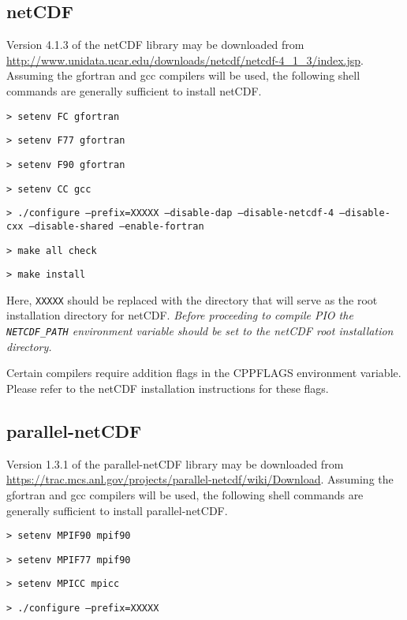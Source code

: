 \subsection{netCDF}
\label{serial_netcdf}

Version 4.1.3 of the netCDF library may be downloaded from
\url{http://www.unidata.ucar.edu/downloads/netcdf/netcdf-4\_1\_3/index.jsp}.
Assuming the gfortran and gcc compilers will be used, the following shell
commands are generally sufficient to install netCDF.

\vspace{12pt}
{\tt > setenv FC gfortran}

{\tt > setenv F77 gfortran} 

{\tt > setenv F90 gfortran}

{\tt > setenv CC gcc} 

{\tt > ./configure --prefix=XXXXX --disable-dap --disable-netcdf-4 --disable-cxx \hfill\break --disable-shared --enable-fortran} 

{\tt > make all check}

{\tt > make install}
\vspace{12pt}

Here, {\tt XXXXX} should be replaced with the directory that will serve as the
root installation directory for netCDF.  {\em Before proceeding to compile PIO
the {\tt NETCDF\_PATH} environment variable should be set to the netCDF root
installation directory.}

Certain compilers require addition flags in the CPPFLAGS environment variable.
Please refer to the netCDF installation instructions for these flags.

\subsection{parallel-netCDF}
\label{parallel_netcdf}

Version 1.3.1 of the parallel-netCDF library may be downloaded from
\url{https://trac.mcs.anl.gov/projects/parallel-netcdf/wiki/Download}.  Assuming
the gfortran and gcc compilers will be used, the following shell commands are
generally sufficient to install parallel-netCDF.

\vspace{12pt}
{\tt > setenv MPIF90 mpif90}

{\tt > setenv MPIF77 mpif90} 

{\tt > setenv MPICC mpicc}  

{\tt > ./configure --prefix=XXXXX} 

